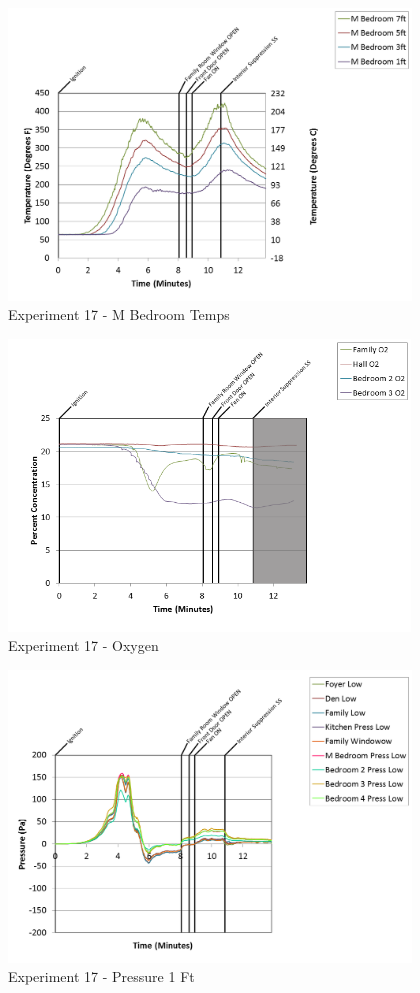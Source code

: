 \documentclass{article}
\begin{document}
\begin{appendices}
\clearpage

\begin{figure}[h!]
	\centering
	\includegraphics[height=3.05in]{0_Images/Results_Charts/Exp_17_Charts/MBedroomTemps.png}
	\caption{Experiment 17 - M Bedroom Temps}
\end{figure}


\begin{figure}[h!]
	\centering
	\includegraphics[height=3.05in]{0_Images/Results_Charts/Exp_17_Charts/Oxygen.png}
	\caption{Experiment 17 - Oxygen}
\end{figure}

\clearpage

\begin{figure}[h!]
	\centering
	\includegraphics[height=3.05in]{0_Images/Results_Charts/Exp_17_Charts/Pressure1Ft.png}
	\caption{Experiment 17 - Pressure 1 Ft}
\end{figure}



\end{appendices}
\end{document}

